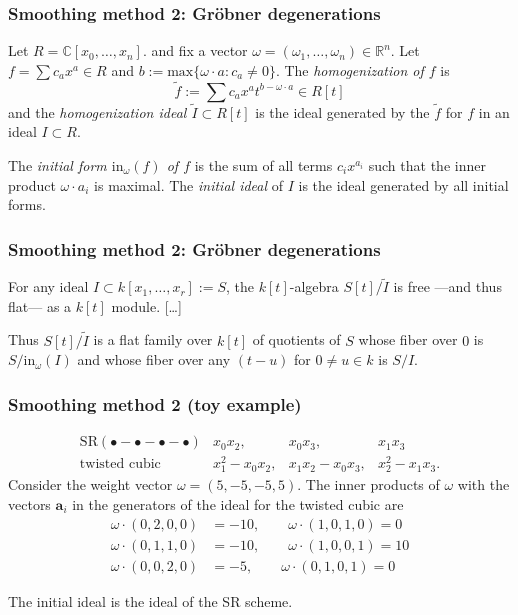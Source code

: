 \documentclass{beamer}
\begin{document}
\begin{frame}%
\frametitle{Smoothing method 2: Gröbner degenerations}

Let $R=\mathbb{C}[x_0,…,x_n]$.
and fix a vector $\omega=(\omega_1,\ldots,\omega_n)\in\mathbb{R}^n$.
Let $f=\sum c_a x^a \in R$
and $b:=\text{max}\{\omega\cdot a:c_a \neq 0\}$.
The {\it homogenization of $f$} is
$$
\tilde{f}:=\sum c_a x^a t^{b-\omega\cdot a} \in R[t]
$$
and the {\it homogenization ideal $\tilde{I}\subset R[t]$} 
is the ideal generated by the $\tilde{f}$ for $f$ in an ideal $I\subset R$.

\vspace{1em}
The {\it initial form $\text{in}_\omega(f)$ of $f$} is
the sum of all terms
$c_ix^{a_i}$ such that the inner product $\omega\cdot a_i$
is maximal. 
The {\it initial ideal} of $I$ is the ideal
generated by all initial forms.
\end{frame}

\begin{frame}%
\frametitle{Smoothing method 2: Gröbner degenerations}

\begin{theorem}
\label{theorem-grobner-flat-morphism}
For any ideal $I \subset k[x_1,\ldots,x_r]:=S$, the
$k[t]$-algebra $S[t]/\tilde{I}$ is free ---and thus flat---
as a $k[t]$ module. […]

\vspace{2em}
Thus $S[t]/\tilde{I}$ is a flat family over $k[t]$ of quotients
of $S$ whose fiber over $0$ is $S/\text{in}_\omega(I)$ and
whose fiber over any $(t-u)$ for $0 \neq u \in k$ is $S/I$.
\end{theorem}


\end{frame}

\begin{frame}%
\frametitle{Smoothing method 2 (toy example)}
\vspace{-2em}
$$
\begin{array}{cccc}
\text{SR}(\bullet-\bullet-\bullet-\bullet) & x_0x_2, & x_0x_3, & x_1x_3 \\
\text{twisted cubic} 
& x_1^2-x_0x_2, & x_1x_2-x_0x_3, & x_2^2-x_1x_3.
\end{array}
$$
Consider the weight vector $\omega=(5,-5,-5,5)$.
The inner products of $\omega$ with the vectors $\mathbf{a}_i$
in the generators of the ideal for the twisted cubic are
\begin{align*}
\omega\cdot(0,2,0,0)&=-10,\qquad \omega\cdot(1,0,1,0)=0\\
\omega\cdot(0,1,1,0)&=-10,\qquad \omega\cdot(1,0,0,1)=10\\
\omega\cdot(0,0,2,0)&=-5,\qquad \omega\cdot(0,1,0,1)=0
\end{align*}

\noindent
The initial ideal is the ideal of the SR scheme.
\end{frame}
\end{document}
